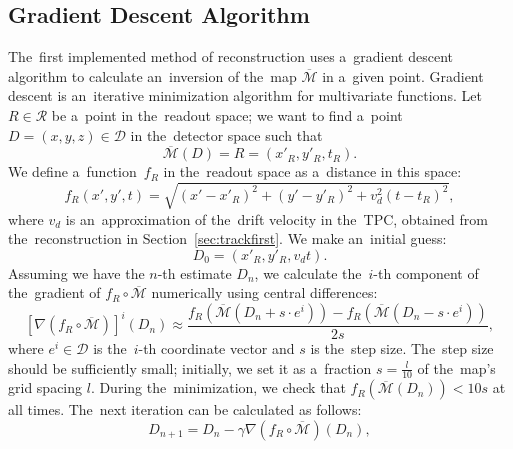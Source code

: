 		\subsection{Gradient Descent Algorithm}
		\label{sec:grad}			
			The~first implemented method of reconstruction uses a~gradient descent algorithm to calculate an~inversion of the~map $\overbar{\mathcal{M}}$ in a~given point. Gradient descent is an~iterative minimization algorithm for multivariate functions. Let $R\in\mathcal{R}$ be a~point in the~readout space; we want to find a~point $D = (x,y,z) \in\mathcal{D}$ in the~detector space such that 
				\begin{equation}
					\overbar{\mathcal{M}}(D) = R = (x'_R,y'_R,t_R).
				\end{equation}
			We define a~function~$f_R$ in the~readout space as a~distance in this space:
				\begin{equation}
					f_R(x',y',t) = \sqrt{(x'-x'_R)^2+(y'-y'_R)^2+v_d^2(t-t_R)^2},
				\end{equation}
			where $v_d$ is an~approximation of the~drift velocity in the~\ac{TPC}, obtained from the~reconstruction in Section~\ref{sec:trackfirst}. We make an~initial guess:
				\begin{equation}
					D_0 = (x'_R,y'_R,v_dt).
				\end{equation}
			Assuming we have the $n$-th estimate $D_n$, we calculate the~$i$-th component of the~gradient of $f_R\circ\overbar{\mathcal{M}}$ numerically using central differences:
				\begin{equation}
					\left[\nabla(f_R\circ\overbar{\mathcal{M}})\right]^i(D_n) \approx \frac{f_R(\overbar{\mathcal{M}}(D_n+s\cdot e^i))-f_R(\overbar{\mathcal{M}}(D_n-s\cdot e^i))}{2s},
				\end{equation}
			where $e^i\in\mathcal{D}$ is the~$i$-th coordinate vector and $s$ is the~step size. The~step size should be sufficiently small; initially, we set it as a~fraction $s = \frac{l}{10}$ of the~map's grid spacing $l$. During the~minimization, we check that $f_R(\overbar{\mathcal{M}}(D_n))<10s$ at all times. The~next iteration can be calculated as follows:
				\begin{equation}
					D_{n+1} = D_n - \gamma \nabla(f_R\circ\overbar{\mathcal{M}})(D_n),
				\end{equation}
